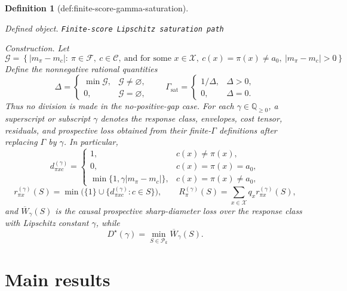 \documentclass{article}
\newtheorem{definition}{Definition}
\begin{document}
\begin{definition}[def:finite-score-gamma-saturation]\label{def:finite-score-gamma-saturation}
\par\smallskip\noindent\emph{Defined object.} \texttt{Finite-\allowbreak{}score Lipschitz saturation path}
\par\smallskip\noindent\emph{Construction.} Let
\[
\mathcal G
=\left\{|m_\pi-m_c|:\ \pi\in\mathcal F,\ c\in\mathcal C,
\ \text{and for some }x\in\mathcal X,
\ c(x)=\pi(x)\neq a_0,\ |m_\pi-m_c|>0\right\}.
\]
Define the nonnegative rational quantities
\[
\Delta=
\begin{cases}
\min\mathcal G,&\mathcal G\neq\varnothing,\\
0,&\mathcal G=\varnothing,
\end{cases}
\qquad
\Gamma_{\mathrm{sat}}=
\begin{cases}
1/\Delta,&\Delta>0,\\
0,&\Delta=0.
\end{cases}                                                        \tag{11}
\]
Thus no division is made in the no-positive-gap case.  For each
\(\gamma\in\mathbb Q_{\geq0}\), a superscript or subscript \(\gamma\)
denotes the response class, envelopes, cost tensor, residuals, and
prospective loss obtained from their finite-\(\Gamma\) definitions after
replacing \(\Gamma\) by \(\gamma\).  In particular,
\[
d^{(\gamma)}_{\pi xc}=
\begin{cases}
1,&c(x)\neq\pi(x),\\
0,&c(x)=\pi(x)=a_0,\\
\min\{1,\gamma|m_\pi-m_c|\},&c(x)=\pi(x)\neq a_0,
\end{cases}
\]
\[
r^{(\gamma)}_{\pi x}(S)
=\min\bigl(\{1\}\cup\{d^{(\gamma)}_{\pi xc}:c\in S\}\bigr),
\qquad
R^{(\gamma)}_\pi(S)=\sum_{x\in\mathcal X}q_x
r^{(\gamma)}_{\pi x}(S),
\]
and \(\overline W_\gamma(S)\) is the causal prospective sharp-diameter
loss over the response class with Lipschitz constant \(\gamma\), while
\[
D^\star(\gamma)=\min_{S\in\mathcal P_k}\overline W_\gamma(S).
\]
\end{definition}

\section{Main results}
\end{document}
